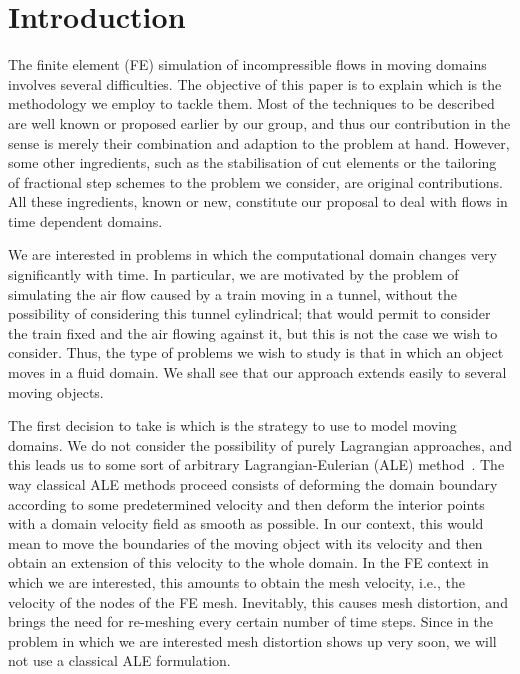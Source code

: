 \documentclass[11pt,a4paper,oneside,reqno]{amsart}
\begin{document}
\section{Introduction}\label{sec:introduction}

The finite element (FE) simulation of incompressible flows in moving domains involves several difficulties. The objective of this paper is to explain which is the methodology we employ to tackle them. Most of the techniques to be described are well known or proposed earlier by our group, and thus our contribution in the sense is merely their combination and adaption to the problem at hand. However, some other ingredients, such as the stabilisation of cut elements or the tailoring of fractional step schemes to the problem we consider, are original contributions. All these ingredients, known or new, constitute our proposal to deal with flows in time dependent domains.

We are interested in problems in which the computational domain changes very significantly with time. In particular, we are motivated by the problem of simulating the air flow caused by a train moving in a tunnel, without the possibility of considering this tunnel cylindrical; that would permit to consider the train fixed and the air flowing against it, but this is not the case we wish to consider. Thus, the type of problems we wish to study is that in which an object moves in a fluid domain. We shall see that our approach extends easily to several moving objects.

The first decision to take is which is the strategy to use to model moving domains. We do not consider the possibility of purely Lagrangian approaches, and this leads us to some sort of arbitrary Lagrangian-Eulerian (ALE) method~\cite{DoneaALE,badia-codina-2006-1}. The way classical ALE methods proceed consists of deforming the domain boundary according to some predetermined velocity and then deform the interior points with a domain velocity field as smooth as possible. In our context, this would mean to move the boundaries of the moving object with its velocity and then obtain an extension of this velocity to the whole domain. In the FE context in which we are interested, this amounts to obtain the mesh velocity, i.e., the velocity of the nodes of the FE mesh. Inevitably, this causes mesh distortion, and brings the need for re-meshing every certain number of time steps. Since in the problem in which we are interested mesh distortion shows up very soon, we will not use a classical ALE formulation. 
\end{document}
